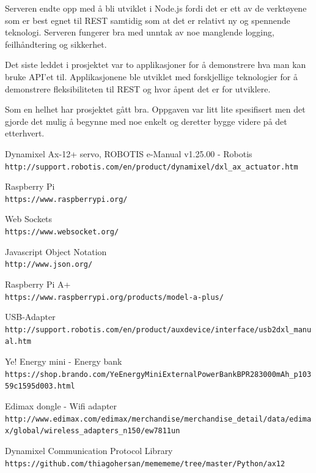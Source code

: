 \documentclass[12pt]{report}
\begin{document}
Serveren endte opp med å bli utviklet i Node.js fordi det er ett av de verktøyene som er best egnet til REST samtidig som at det er relativt ny og spennende teknologi. Serveren fungerer bra med unntak av noe manglende logging, feilhåndtering og sikkerhet.

Det siste leddet i prosjektet var to applikasjoner for å demonstrere hva man kan bruke API’et til. Applikasjonene ble utviklet med forskjellige teknologier for å demonstrere fleksibiliteten til REST og hvor åpent det er for utviklere.

Som en helhet har prosjektet gått bra. Oppgaven var litt lite spesifisert men det gjorde det mulig å begynne med noe enkelt og deretter bygge videre på det etterhvert.

\renewcommand{\bibname}{Referanser}

\begin{thebibliography}{3}
	Dynamixel Ax-12+ servo, ROBOTIS e-Manual v1.25.00 - Robotis
	\\\texttt{http://support.robotis.com/en/product/dynamixel/dxl\_ax\_actuator.htm}
 
	Raspberry Pi
	\\\texttt{https://www.raspberrypi.org/}
 
	Web Sockets
	\\\texttt{https://www.websocket.org/}

	Javascript Object Notation
	\\\texttt{http://www.json.org/}

	Raspberry Pi A+
	\\\texttt{https://www.raspberrypi.org/products/model-a-plus/}
	
	USB-Adapter
	\\\texttt{http://support.robotis.com/en/product/auxdevice/interface/usb2dxl\_manual.htm}
	
	Ye! Energy mini - Energy bank
	\\\texttt{https://shop.brando.com/Ye\-Energy\-Mini\-External\-Power\-Bank\-BPR28\-3000mAh\_p10359c1595d003.html}
	
	Edimax dongle - Wifi adapter
	\\\texttt{http://www.edimax.com/edimax/merchandise/merchandise\_detail/data/edimax/global/wireless\_adapters\_n150/ew\-7811un}
	
	Dynamixel Communication Protocol Library
	\\\texttt{https://github.com/thiagohersan/memememe/tree/master/Python/ax12}


\end{thebibliography}
\end{document}
